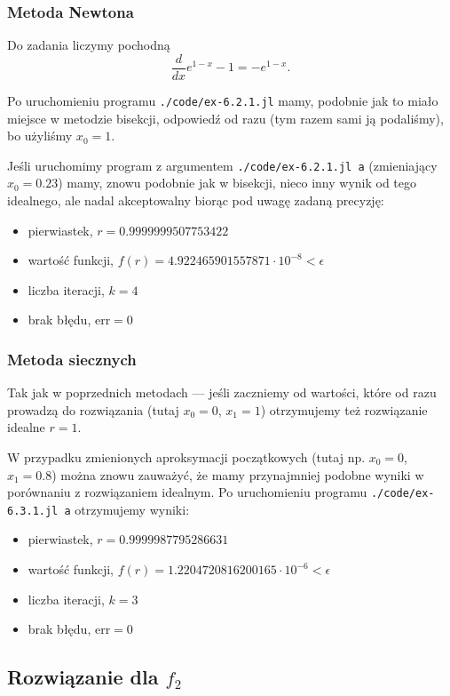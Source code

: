 \documentclass[10pt]{article}
\begin{document}
\subsubsection{Metoda Newtona}

Do zadania liczymy pochodną
$$
\frac{d}{dx} e^{1-x} - 1 = -e^{1-x}.
$$

Po uruchomieniu programu \texttt{./code/ex-6.2.1.jl} mamy, podobnie jak to miało miejsce w metodzie bisekcji, odpowiedź od razu (tym razem sami ją podaliśmy), bo użyliśmy $x_0 = 1$.

Jeśli uruchomimy program z argumentem \texttt{./code/ex-6.2.1.jl a} (zmieniający $x_0 = 0.23$) mamy, znowu podobnie jak w bisekcji, nieco inny wynik od tego idealnego, ale nadal akceptowalny biorąc pod uwagę zadaną precyzję:
\begin{itemize}
    \item pierwiastek, $r = 0.9999999507753422$
    \item wartość funkcji, $f(r) = 4.922465901557871 \cdot 10^{-8} < \epsilon$
    \item liczba iteracji, $k = 4$
    \item brak błędu, $\mathrm{err} = 0$
\end{itemize}

\subsubsection{Metoda siecznych}

Tak jak w poprzednich metodach — jeśli zaczniemy od wartości, które od razu prowadzą do rozwiązania (tutaj $x_0 = 0$, $x_1 = 1$) otrzymujemy też rozwiązanie idealne $r = 1$.

W przypadku zmienionych aproksymacji początkowych (tutaj np. $x_0 = 0$, $x_1 = 0.8$) można znowu zauważyć, że mamy przynajmniej podobne wyniki w porównaniu z rozwiązaniem idealnym. Po uruchomieniu programu \texttt{./code/ex-6.3.1.jl a} otrzymujemy wyniki:
\begin{itemize}
    \item pierwiastek, $r = 0.9999987795286631$
    \item wartość funkcji, $f(r) = 1.2204720816200165 \cdot 10^{-6} < \epsilon$
    \item liczba iteracji, $k = 3$
    \item brak błędu, $\mathrm{err} = 0$
\end{itemize}

\subsection{Rozwiązanie dla $f_2$}\label{6.f_2}
\end{document}
